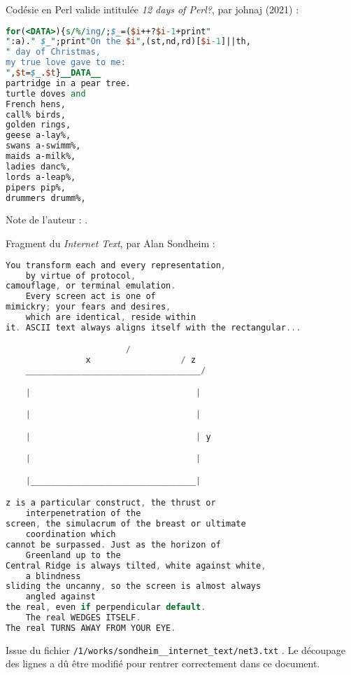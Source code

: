 \documentclass[12pt]{article} %
\begin{document}
\newpage
Codésie en Perl valide intitulée \textit{12 days of Perl?}, par johnaj (2021) :
\begin{lstlisting}[language=Perl, caption={12 days of Perl?}, label={codework:12daysPerl}]
for(<DATA>){s/%/ing/;$_=($i++?$i-1+print"
":a)." $_";print"On the $i",(st,nd,rd)[$i-1]||th,
" day of Christmas,
my true love gave to me:
",$t=$_.$t}__DATA__
partridge in a pear tree.
turtle doves and
French hens,
call% birds,
golden rings,
geese a-lay%,
swans a-swimm%,
maids a-milk%,
ladies danc%,
lords a-leap%,
pipers pip%,
drummers drumm%,
\end{lstlisting}
Note de l'auteur :  \cite{codework-12DaysOfPerl}.

\newpage
Fragment du \textit{Internet Text}, par Alan Sondheim :
\begin{lstlisting}[language=C, caption={Internet Text, fragment de net3.txt}, label={codework:internet-text}]
You transform each and every representation, 
    by virtue of protocol,
camouflage, or terminal emulation. 
    Every screen act is one of
mimickry; your fears and desires, 
    which are identical, reside within
it. ASCII text always aligns itself with the rectangular...

                        /
                x                  / z
    ___________________________________/

    |                                 |

    |                                 |

    |                                 | y

    |                                 |

    |_________________________________|

z is a particular construct, the thrust or 
    interpenetration of the
screen, the simulacrum of the breast or ultimate
    coordination which
cannot be surpassed. Just as the horizon of 
    Greenland up to the
Central Ridge is always tilted, white against white, 
    a blindness
sliding the uncanny, so the screen is almost always 
    angled against
the real, even if perpendicular default. 
    The real WEDGES ITSELF.
The real TURNS AWAY FROM YOUR EYE.
\end{lstlisting}
Issue du fichier \verb|/1/works/sondheim__internet_text/net3.txt| \cite{ASondheim-net3}. Le découpage des lignes a dû être modifié pour rentrer correctement dans ce document.
\end{document}
